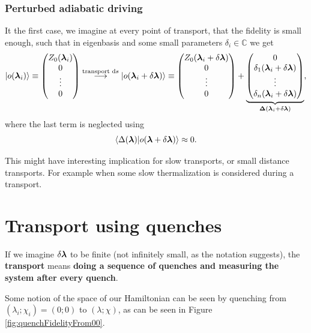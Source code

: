 \subsubsection{Perturbed adiabatic driving}
It the first case, we imagine at every point of transport, that the fidelity is small enough, such that in eigenbasis and some small parameters $\delta_i\in \mathbb{C}$ we get
$$\ket{o({\bm\lambda}_i)}\equiv \begin{pmatrix}
    Z_0({\bm\lambda}_i)\\
    0\\
    \vdots \\
    0
\end{pmatrix} \overset{\text{transport }\mathrm{d} s}{\longrightarrow} \ket{o({\bm\lambda}_i+\delta {\bm\lambda})}\equiv\begin{pmatrix}
    Z_0({\bm\lambda}_i+\delta {\bm\lambda})\\
    0\\
    \vdots \\
    0
\end{pmatrix} +\underbrace{\begin{pmatrix}
    0\\
    \delta_1({\bm\lambda}_i+\delta {\bm\lambda})\\
    \vdots \\
    \delta_n({\bm\lambda}_i+\delta {\bm\lambda})
\end{pmatrix}}_{\mathbf{\Delta}({\bm\lambda}_i+\delta {\bm\lambda})}, $$
where the last term is neglected using 
$$\braket{\Delta({\bm\lambda})|o({\bm\lambda}+\delta{\bm\lambda})}\approx 0.$$

This might have interesting implication for slow transports, or small distance transports. For example when some slow thermalization is considered during a transport.









\section{Transport using quenches}
If we imagine $\delta{\bm\lambda}$ to be finite (not infinitely small, as the notation suggests), the \textbf{transport} means \textbf{doing a sequence of quenches and measuring the system after every quench}.


Some notion of the space of our Hamiltonian can be seen by quenching from $(\lambda_i;\chi_i)=(0;0)$ to $(\lambda;\chi)$, as can be seen in Figure \ref{fig:quenchFidelityFrom00}.

